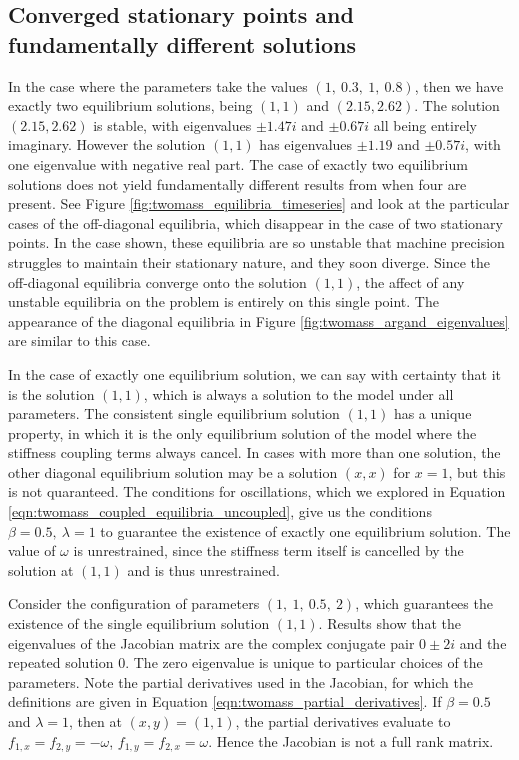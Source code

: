 \documentclass{report}
\begin{document}
\subsection{Converged stationary points and fundamentally different solutions}

In the case where the parameters take the values \((1,~0.3,~1,~0.8)\),
then we have exactly two equilibrium solutions,
being \((1,1)\) and \((2.15,2.62)\).
The solution \((2.15,2.62)\) is stable, with eigenvalues $\pm 1.47i$ and $\pm 0.67i$ all being entirely imaginary.
However the solution \((1,1)\) has eigenvalues $\pm 1.19$ and $\pm 0.57i$, with one eigenvalue with negative real part. %
The case of exactly two equilibrium solutions does not yield fundamentally different results from when four are present.
See Figure \ref{fig:twomass_equilibria_timeseries} and look at the particular cases of the off-diagonal equilibria,
which disappear in the case of two stationary points.
In the case shown, these equilibria are so unstable that machine precision struggles to maintain their stationary nature,
and they soon diverge.
Since the off-diagonal equilibria converge onto the solution \((1,1)\),
the affect of any unstable equilibria on the problem is entirely on this single point.
The appearance of the diagonal equilibria in Figure \ref{fig:twomass_argand_eigenvalues} are similar to this case.

In the case of exactly one equilibrium solution,
we can say with certainty that it is the solution \((1,1)\),
which is always a solution to the model under all parameters.
The consistent single equilibrium solution \((1,1)\) has a unique property,
in which it is the only equilibrium solution of the model where the stiffness coupling terms always cancel.
In cases with more than one solution, the other diagonal equilibrium solution may be a solution \((x,x)\) for $x=1$,
but this is not quaranteed.
The conditions for oscillations,
which we explored in Equation \ref{eqn:twomass_coupled_equilibria_uncoupled},
give us the conditions \(\beta=0.5,~\lambda=1\) to guarantee the existence of exactly one equilibrium solution.
The value of $\omega$ is unrestrained, since the stiffness term itself is cancelled by the solution at \((1,1)\) and is thus unrestrained.

Consider the configuration of parameters \((1,~1,~0.5,~2)\),
which guarantees the existence of the single equilibrium solution \((1,1)\).
Results show that the eigenvalues of the Jacobian matrix are the complex conjugate pair $ 0 \pm 2i$ and the repeated solution $0$.  %
The zero eigenvalue is unique to particular choices of the parameters.
Note the partial derivatives used in the Jacobian, for which the definitions are given in Equation \ref{eqn:twomass_partial_derivatives}.
If $\beta = 0.5$ and $\lambda = 1$, then at \((x,y) = (1,1)\),
the partial derivatives evaluate to \(f_{1,x} = f_{2,y} = -\omega\), \(f_{1,y} = f_{2,x} = \omega\).
Hence the Jacobian is not a full rank matrix.
\end{document}
